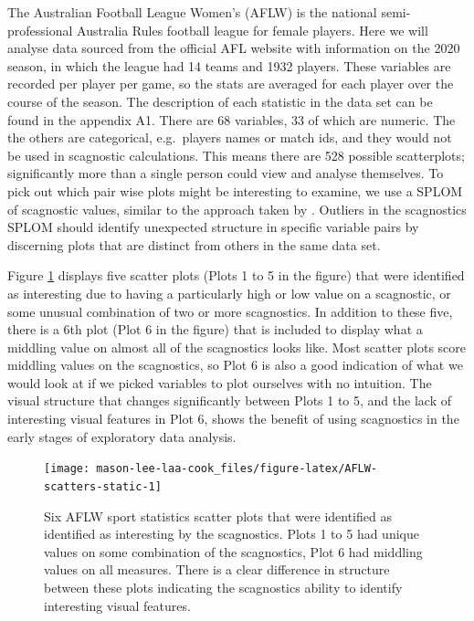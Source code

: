 The Australian Football League Women's (AFLW) is the national semi-professional Australia Rules football league for female players. Here we will analyse data sourced from the official AFL website with information on the 2020 season, in which the league had 14 teams and 1932 players. These variables are recorded per player per game, so the stats are averaged for each player over the course of the season. The description of each statistic in the data set can be found in the appendix A1. There are 68 variables, 33 of which are numeric. The the others are categorical, e.g.~players names or match ids, and they would not be used in scagnostic calculations. This means there are 528 possible scatterplots; significantly more than a single person could view and analyse themselves. To pick out which pair wise plots might be interesting to examine, we use a SPLOM of scagnostic values, similar to the approach taken by \citet{scagdist}. Outliers in the scagnostics SPLOM should identify unexpected structure in specific variable pairs by discerning plots that are distinct from others in the same data set.

Figure \ref{fig:AFLW-scatters-static} displays five scatter plots (Plots 1 to 5 in the figure) that were identified as interesting due to having a particularly high or low value on a scagnostic, or some unusual combination of two or more scagnostics. In addition to these five, there is a 6th plot (Plot 6 in the figure) that is included to display what a middling value on almost all of the scagnostics looks like. Most scatter plots score middling values on the scagnostics, so Plot 6 is also a good indication of what we would look at if we picked variables to plot ourselves with no intuition. The visual structure that changes significantly between Plots 1 to 5, and the lack of interesting visual features in Plot 6, shows the benefit of using scagnostics in the early stages of exploratory data analysis.

\begin{figure}

{\centering \texttt{[image: mason-lee-laa-cook\_files/figure-latex/AFLW-scatters-static-1]} 

}

\caption{Six AFLW sport statistics scatter plots that were identified as identified as interesting by the scagnostics. Plots 1 to 5 had unique values on some combination of the scagnostics, Plot 6 had middling values on all measures. There is a clear difference in structure between these plots indicating the scagnostics ability to identify interesting visual features.}\label{fig:AFLW-scatters-static}
\end{figure}

